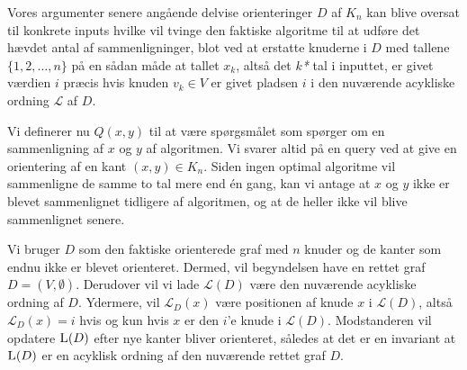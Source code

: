 Vores argumenter senere angående delvise orienteringer $D$ af $K_{n}$ kan blive oversat til konkrete inputs hvilke vil tvinge den faktiske algoritme til at udføre det hævdet antal af sammenligninger, blot ved at erstatte knuderne i $D$  med tallene $\{1, 2, \ldots, n\}$ på en sådan måde at tallet $x_{k}$, altså det $k$\emph{*} tal i inputtet, er givet værdien $i$ præcis hvis knuden $v_{k} \in V$ er givet pladsen $i$ i den nuværende acykliske ordning $\mathcal{L}$ af $D$.

Vi definerer nu $Q(x,y)$ til at være spørgsmålet som spørger om en sammenligning af $x$ og $y$ af algoritmen. Vi svarer altid på en query ved at give en orientering af en kant $(x,y) \in K_{n}$. Siden ingen optimal algoritme vil sammenligne de samme to tal mere end én gang, kan vi antage at $x$ og $y$ ikke er blevet sammenlignet tidligere af algoritmen, og at de heller ikke vil blive sammenlignet senere.

Vi bruger $D$ som den faktiske orienterede graf med $n$ knuder og de kanter som endnu ikke er blevet orienteret. Dermed, vil begyndelsen have en rettet graf $D = (V, \emptyset)$. Derudover vil vi lade $\mathcal{L}(D)$ være den nuværende acykliske ordning af $D$. Ydermere, vil $\mathcal{L}_{D}(x)$ være positionen af knude $x$ i $\mathcal{L}(D)$, altså $\mathcal{L}_{D}(x) = i$ hvis og kun hvis $x$ er den $i$'e knude i $\mathcal{L}(D)$. Modstanderen vil opdatere $\textsc{L}(D)$ efter nye kanter bliver orienteret, således at det er en invariant at $\textsc{L}(D)$ er en acyklisk ordning af den nuværende rettet graf $D$.


